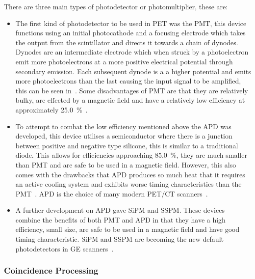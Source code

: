                 There are three main types of photodetector or photomultiplier, these are:
                
                \begin{itemize}
                    \item The first kind of photodetector to be used in \gls{PET} was the \gls{PMT}, this device functions using an initial photocathode and a focusing electrode which takes the output from the scintillator and directs it towards a chain of dynodes. Dynodes are an intermediate electrode which when struck by a photoelectron emit more photoelectrons at a more positive electrical potential through secondary emission. Each subsequent dynode is a a higher potential and emits more photoelectrons than the last causing the input signal to be amplified, this can be seen in~. Some disadvantages of \gls{PMT} are that they are relatively bulky, are effected by a magnetic field and have a relatively low efficiency at approximately \SI{25.0}{\percent}~.
                    
                    \item To attempt to combat the low efficiency mentioned above the \gls{APD} was developed, this device utilises a semiconductor where there is a junction between positive and negative type silicone, this is similar to a traditional diode. This allows for efficiencies approaching \SI{85.0}{\percent}, they are much smaller than \gls{PMT} and are safe to be used in a magnetic field. However, this also comes with the drawbacks that \gls{APD} produces so much heat that it requires an active cooling system and exhibits worse timing characteristics than the \gls{PMT}~. \gls{APD} is the choice of many modern \gls{PET}/\gls{CT} scanners~.
                    
                    \item A further development on \gls{APD} gave \gls{SiPM} and \gls{SSPM}. These devices combine the benefits of both \gls{PMT} and \gls{APD} in that they have a high efficiency, small size, are safe to be used in a magnetic field and have good timing characteristic. \gls{SiPM} and \gls{SSPM} are becoming the new default photodetectors in \gls{GE} scanners~.
                \end{itemize}
            
            \subsubsection{Coincidence Processing} \label{sec:coincidence_processing}
                
